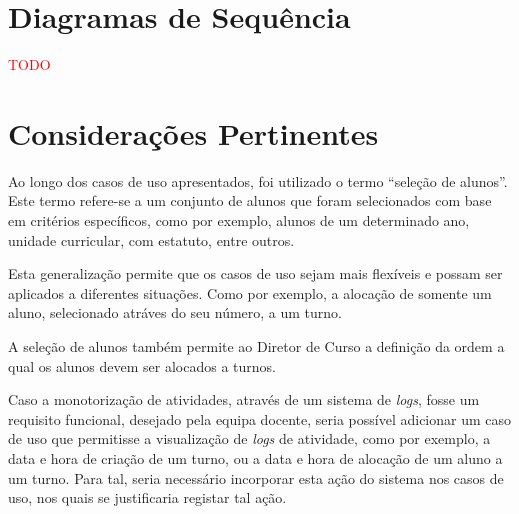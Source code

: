 \documentclass[a4paper,12pt]{scrreprt}
\begin{document}
\chapter{Diagramas de Sequência}
\vspace{1cm}

\textcolor{red}{TODO}



\chapter{Considerações Pertinentes}
\vspace{1cm}

Ao longo dos casos de uso apresentados, foi utilizado o termo “seleção de alunos”.
Este termo refere-se a um conjunto de alunos que foram selecionados com base em critérios específicos,
como por exemplo, alunos de um determinado ano, unidade curricular, com estatuto, entre outros.

Esta generalização permite que os casos de uso sejam mais flexíveis
e possam ser aplicados a diferentes situações. Como por exemplo, a alocação de somente
um aluno, selecionado atráves do seu número, a um turno.

A seleção de alunos também permite ao Diretor de Curso a definição da ordem
a qual os alunos devem ser alocados a turnos.

\vspace{1cm}

Caso a monotorização de atividades, através de um sistema de \textit{logs}, fosse um requisito funcional,
desejado pela equipa docente, seria possível adicionar um caso de uso que permitisse a visualização
de \textit{logs} de atividade, como por exemplo, a data e hora de criação de um turno,
ou a data e hora de alocação de um aluno a um turno. Para tal, seria necessário
incorporar esta ação do sistema nos casos de uso, nos quais se justificaria registar tal ação.

\end{document}
